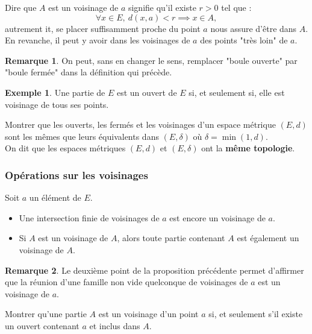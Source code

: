 \documentclass[french]{article}
\theoremstyle{plain}
\theoremstyle{definition}
\newtheorem*{ex}{Exemple}
\newtheorem*{rmq}{Remarque}
\theoremstyle{remark}
\begin{document}
Dire que $A$ est un voisinage de $a$ signifie qu'il existe $r>0$ tel que :
$$\forall x\in E,\ d(x,a)<r\implies x\in A,$$ autrement it, se placer suffisamment proche du point $a$ nous assure d'être dans $A$. \\
En revanche, il peut y avoir dans les voisinages de $a$ des points "très loin" de $a$.

\begin{rmq}
	On peut, sans en changer le sens, remplacer "boule ouverte" par "boule fermée" dans la définition qui précède.
\end{rmq}

\begin{ex}
	Une partie de $E$ est un ouvert de $E$ si, et seulement si, elle est voisinage de tous ses points.
\end{ex}

\begin{exo}
	Montrer que les ouverts, les fermés et les voisinages d'un espace métrique $(E,d)$ sont les mêmes que leurs équivalents dans $(E,\delta)$ où $\delta=\min(1,d)$. \\
	On dit que les espaces métriques $(E,d)$ et $(E,\delta)$ ont la \textbf{même topologie}.
\end{exo}

\subsubsection*{Opérations sur les voisinages}

\begin{prop}%
	Soit $a$ un élément de $E$.
	\begin{itemize}
		\item Une intersection finie de voisinages de $a$ est encore un voisinage de $a$.
		\item Si $A$ est un voisinage de $A$, alors toute partie contenant $A$ est également un voisinage de $A$.
	\end{itemize}
\end{prop}

\begin{rmq}
	Le deuxième point de la proposition précédente permet d'affirmer que la réunion d'une famille non vide quelconque de voisinages de $a$ est un voisinage de $a$.
\end{rmq}

\begin{exo}
	Montrer qu'une partie $A$ est un voisinage d'un point $a$ si, et seulement s'il existe un ouvert contenant $a$ et inclus dans $A$.
\end{exo}
\end{document}
